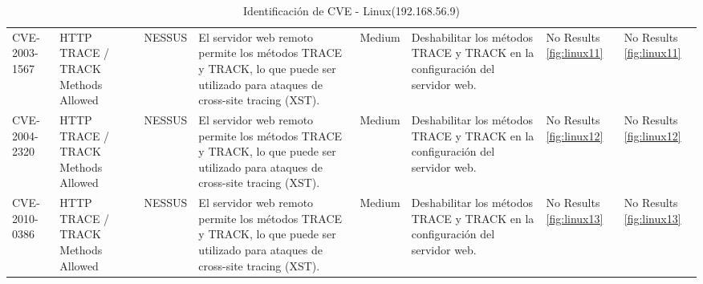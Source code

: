 \documentclass[a4paper,12pt]{article} %
\begin{document}
\begin{table}[hp!]
{\begin{tabular}{m{2.1cm}|m{2.6cm}|m{2cm}|m{4cm}|m{1cm}|m{3cm}|m{5cm}|m{5cm}}
  {CVE-2003-1567} & {HTTP TRACE / TRACK Methods Allowed} & {NESSUS} & {El servidor web remoto permite los métodos TRACE y TRACK, lo que puede ser utilizado para ataques de cross-site tracing (XST).} & {Medium} & {Deshabilitar los métodos TRACE y TRACK en la configuración del servidor web.}  & {No Results \ref{fig:linux11}}  & {No Results \ref{fig:linux11}}\\
  {CVE-2004-2320} & {HTTP TRACE / TRACK Methods Allowed} & {NESSUS} & {El servidor web remoto permite los métodos TRACE y TRACK, lo que puede ser utilizado para ataques de cross-site tracing (XST).} & {Medium} & {Deshabilitar los métodos TRACE y TRACK en la configuración del servidor web.}  & {No Results \ref{fig:linux12}}  & {No Results \ref{fig:linux12}}\\
  {CVE-2010-0386} & {HTTP TRACE / TRACK Methods Allowed} & {NESSUS} & {El servidor web remoto permite los métodos TRACE y TRACK, lo que puede ser utilizado para ataques de cross-site tracing (XST).} & {Medium} & {Deshabilitar los métodos TRACE y TRACK en la configuración del servidor web.}  & {No Results \ref{fig:linux13}}  & {No Results \ref{fig:linux13}}\\
  
  \end{tabular}}
  \caption{Identificación de CVE - Linux(192.168.56.9)}
  \label{tab:linux1}
\end{table}

\newpage
\end{document}
